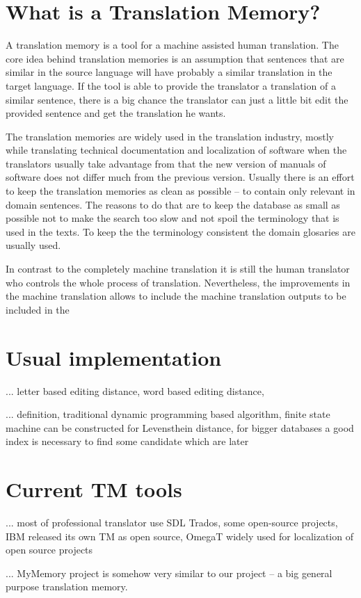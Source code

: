 \section{What is a Translation Memory?}

A translation memory is a tool for a machine assisted human translation. The core idea behind translation memories is an assumption that sentences that are similar in the source language will have probably a similar translation in the target language. If the tool is able to provide the translator a translation of a similar sentence, there is a big chance the translator can just a little bit edit the provided sentence and get the translation he wants.

The translation memories are widely used in the translation industry, mostly while translating technical documentation and localization of software when the translators usually take advantage from that the new version of manuals of software does not differ much from the previous version. Usually there is an effort to keep the translation memories as clean as possible -- to contain only relevant in domain sentences. The reasons to do that are to keep the database as small as possible not to make the search too slow and not spoil the terminology that is used in the texts. To keep the the terminology consistent the domain glosaries are usually used.

In contrast to the completely machine translation it is still the human translator who controls the whole process of translation. Nevertheless, the improvements in the machine translation allows to include the machine translation outputs to be included in the 

\section{Usual implementation}

... letter based editing distance, word based editing distance, 

... definition, traditional dynamic programming based algorithm, finite state machine can be constructed for Levensthein distance, for bigger databases a good index is necessary to find some candidate which are later 

\section{Current TM tools}

... most of professional translator use SDL Trados, some open-source projects, IBM released its own TM as open source, OmegaT widely used for localization of open source projects

... MyMemory project is somehow very similar to our project -- a big general purpose translation memory. 